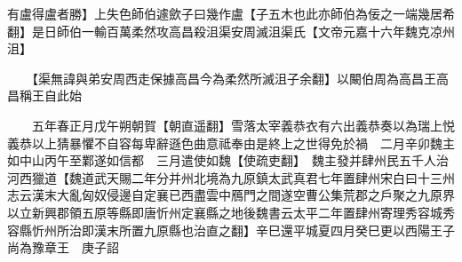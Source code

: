 有盧得盧者勝】上失色師伯遽歛子曰幾作盧【子五木也此亦師伯為佞之一端幾居希翻】是日師伯一輸百萬柔然攻高昌殺沮渠安周滅沮渠氏【文帝元嘉十六年魏克凉州沮】

　　【渠無諱與弟安周西走保據高昌今為柔然所滅沮子余翻】以闞伯周為高昌王高昌稱王自此始

　　五年春正月戊午朔朝賀【朝直遥翻】雪落太宰義恭衣有六出義恭奏以為瑞上悦義恭以上猜暴懼不自容每卑辭遜色曲意祗奉由是終上之世得免於禍　二月辛卯魏主如中山丙午至鄴遂如信都　三月遣使如魏【使疏吏翻】　魏主發并肆州民五千人治河西獵道【魏道武天賜二年分并州北境為九原鎮太武真君七年置肆州宋白曰十三州志云漢末大亂匈奴侵邊自定襄已西盡雲中鴈門之間遂空曹公集荒郡之戶聚之九原界以立新興郡領五原等縣即唐忻州定襄縣之地後魏書云太平二年置肆州寄理秀容城秀容縣忻州所治即漢末所置九原縣也治直之翻】辛巳還平城夏四月癸巳更以西陽王子尚為豫章王　庚子詔


